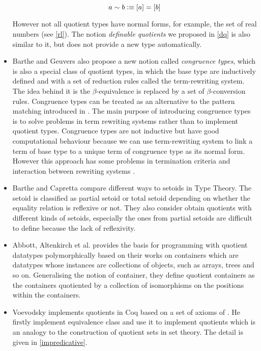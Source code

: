 \begin{itemize}
$$a \sim b \vcentcolon\equiv [ a ] = [ b ]$$

However not all quotient types have normal forms, for example, the set of real numbers (see \autoref{rl}).
The notion \emph{definable quotients} we proposed in \autoref{dq} is also similar to it, but does not provide a new type automatically.

\item Barthe and Geuvers \cite{bar:96} also propose a new notion called
\emph{congruence types}, which is also a special class of quotient
types, in which the base type are inductively defined and with a set
of reduction rules called the term-rewriting system. The idea behind
it is the $\beta$-equivalence is replaced by a set of
$\beta$-conversion rules. Congruence types can be treated as an
alternative to the pattern matching introduced in \cite{coq:92}. The main
purpose of introducing congruence types is to solve problems in
term rewriting systems rather than to implement quotient types.
Congruence types are not inductive but have good computational behaviour because we can use term-rewriting system to link a term of base type to a unique term of congruence type as its normal form.
However this approach has some problems in termination criteria and interaction between rewriting systems \cite{cou:01}.

\item Barthe and Capretta \cite{bar:03} compare different ways to setoids in Type Theory.
The setoid is classified as partial setoid or total setoid depending
on whether the equality relation is reflexive or not. They also
consider obtain quotients with different kinds of setoids, especially
the ones from partial setoids are difficult to define because the lack
of reflexivity.

\item Abbott, Altenkirch et al. \cite{abb:04} provides the basis for
programming with quotient datatypes polymorphically based on their
works on containers which are datatypes whose instances are
collections of objects, such as arrays, trees and so on. Generalising
the notion of container, they define quotient containers as the
containers quotiented by a collection of isomorphisms on the positions
within the containers.

\item Voevodsky \cite{voe:hset} implements quotients in Coq based on a set
of axioms of \hott. He firstly implement
equivalence class and use it to implement quotients which is an
analogy to the construction of quotient sets in set theory. The detail is given in \autoref{impredicative}.
\end{itemize}





